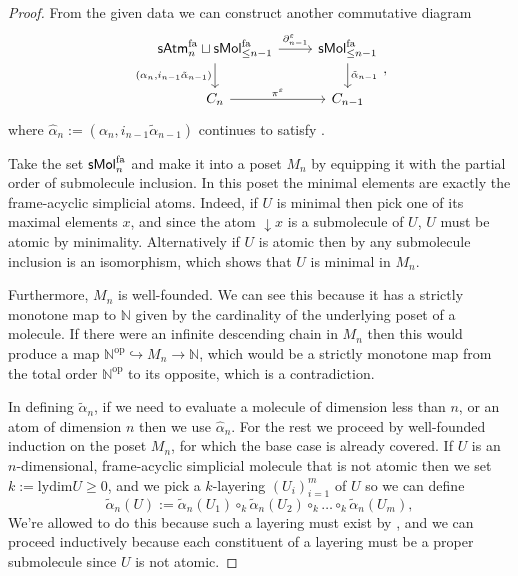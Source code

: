 \documentclass[12pt,a4paper]{article}
\numberwithin{equation}{section}
\newcommand{\atm}[2][s]{%
    \ifx b#1\mathsf{Atm}_{#2}\else
    \ifx s#1\mathsf{sAtm}_{#2}\else
    \ifx f#1\mathsf{sAtm}^{\mathrm{fa}}_{#2}\else
    \mathrm{Illegal~option}%
    \fi\fi\fi
}
\newcommand{\mol}[2][s]{%
    \ifx b#1\mathsf{Mol}_{#2}\else
    \ifx s#1\mathsf{sMol}_{#2}\else
    \ifx f#1\mathsf{sMol}^{\mathrm{fa}}_{#2}\else
    \mathrm{Illegal~option}%
    \fi\fi\fi
}
\begin{document}
\begin{proof}
    From the given data we can construct another commutative diagram
    \begin{equation}
        \begin{tikzcd}
            \atm[f]{n} \sqcup \mol[f]{\leq n -1} \arrow[r, "\partial^\varepsilon_{n-1}"] \arrow[d, "{(\alpha_n, i_{n-1} \tilde{\alpha}_{n-1})}"'] & \mol[f]{\leq n - 1} \arrow[d, "\tilde{\alpha}_{n-1}"] \\
            C_n \arrow[r, "\pi^\varepsilon"] & C_{n-1}
        \end{tikzcd},
    \end{equation}
    where $\hat{\alpha}_n := (\alpha_n, i_{n-1} \tilde{\alpha}_{n-1})$ continues to satisfy .

    Take the set $\mol[f]{n}$ and make it into a poset $M_n$ by equipping it with the partial order of submolecule inclusion. In this poset the minimal elements are exactly the frame-acyclic simplicial atoms. Indeed, if $U$ is minimal then pick one of its maximal elements $x$, and since the atom $\downarrow x$ is a submolecule of $U$, $U$ must be atomic by minimality. Alternatively if $U$ is atomic then by \cite[Prop.\,5.3.11]{hadzihasanovic} any submolecule inclusion is an isomorphism, which shows that $U$ is minimal in $M_n$.
    
    Furthermore, $M_n$ is well-founded. We can see this because it has a strictly monotone map to $\mathbb{N}$ given by the cardinality of the underlying poset of a molecule. If there were an infinite descending chain in $M_n$ then this would produce a map $\mathbb{N}^{\mathrm{op}} \hookrightarrow M_n \to \mathbb{N}$, which would be a strictly monotone map from the total order $\mathbb{N}^{\mathrm{op}}$ to its opposite, which is a contradiction.

    In defining $\tilde{\alpha}_n$, if we need to evaluate a molecule of dimension less than $n$, or an atom of dimension $n$ then we use $\hat{\alpha}_n$. For the rest we proceed by well-founded induction on the poset $M_n$, for which the base case is already covered. If $U$ is an $n$-dimensional, frame-acyclic simplicial molecule that is not atomic then we set $k := \mathrm{lydim} U \geq 0$, and we pick a $k$-layering $(U_i)_{i=1}^m$ of $U$ so we can define
    \begin{equation}
        \tilde{\alpha}_n (U) := \tilde{\alpha}_n (U_1) \circ_k \tilde{\alpha}_n (U_2) \circ_k \dots \circ_k \tilde{\alpha}_n (U_m),
    \end{equation}
    We're allowed to do this because such a layering must exist by , and we can proceed inductively because each constituent of a layering must be a proper submolecule since $U$ is not atomic.


\end{proof}
\end{document}
